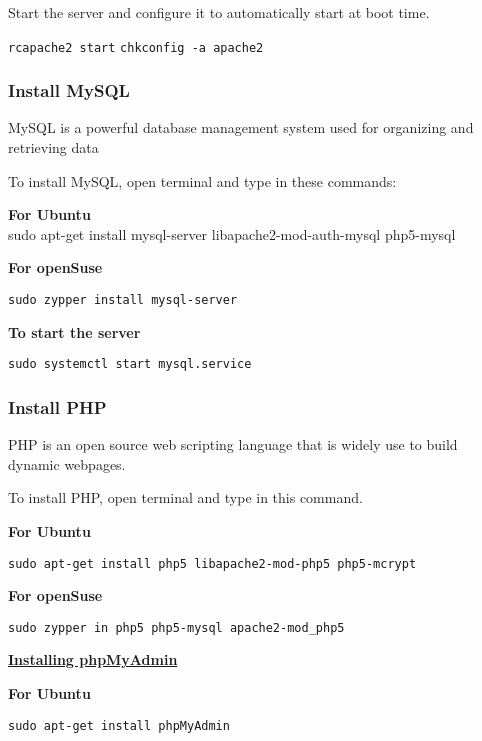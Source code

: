 \documentclass[16pt]{article}
\begin{document}
  Start the server and configure it to automatically start at boot time.

  \texttt{rcapache2 start} \texttt{chkconfig -a apache2}
  
   \vspace{0.5cm}

  \subsubsection{Install MySQL}
  
   \vspace{0.5cm}

  MySQL is a powerful database management system used for organizing and
  retrieving data

  To install MySQL, open terminal and type in these commands:

  \textbf{For Ubuntu} \\ sudo apt-get install mysql-server
  libapache2-mod-auth-mysql php5-mysql

  \textbf{For openSuse}

  \texttt{sudo zypper install mysql-server}

  \textbf{To start the server}

  \texttt{sudo systemctl start mysql.service}
  
   \vspace{1cm}

  \subsubsection{Install PHP}
   \vspace{0.5cm}

  PHP is an open source web scripting language that is widely use to build
  dynamic webpages.

  To install PHP, open terminal and type in this command.

  \textbf{For Ubuntu}

  \texttt{sudo apt-get install php5 libapache2-mod-php5 php5-mcrypt}

  \textbf{For openSuse}

  \texttt{sudo zypper in php5 php5-mysql apache2-mod\_php5}
  
   \vspace{0.5cm}

  {\underline{\textbf{Installing phpMyAdmin}}}

  \textbf{For Ubuntu}

  \texttt{sudo apt-get install phpMyAdmin}
\end{document}
